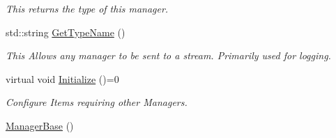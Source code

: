 \begin{DoxyCompactItemize}
\begin{DoxyCompactList}\small\item\em This returns the type of this manager. \item\end{DoxyCompactList}\item 
std::string \hyperlink{classMezzanine_1_1ManagerBase_afb2572589f8389155be7ce256c751d81}{GetTypeName} ()
\begin{DoxyCompactList}\small\item\em This Allows any manager to be sent to a stream. Primarily used for logging. \item\end{DoxyCompactList}\item 
virtual void \hyperlink{classMezzanine_1_1ManagerBase_a864e3cac11928a602c1db28fa2d52ee2}{Initialize} ()=0
\begin{DoxyCompactList}\small\item\em Configure Items requiring other Managers. \item\end{DoxyCompactList}\item 
\hypertarget{classMezzanine_1_1ManagerBase_a6ee3249f71f330394e81e349370d57a8}{
\hyperlink{classMezzanine_1_1ManagerBase_a6ee3249f71f330394e81e349370d57a8}{ManagerBase} ()}
\label{classMezzanine_1_1ManagerBase_a6ee3249f71f330394e81e349370d57a8}


\end{DoxyCompactItemize}
